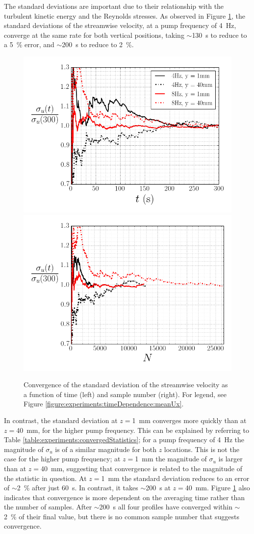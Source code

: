 \documentclass[12pt,oneside,a4paper]{article}
\begin{document}
The standard deviations are important due to their relationship with the turbulent kinetic energy and the Reynolds stresses. As observed in Figure \ref{figure:experiments:timeDependence:RMSux}, the standard deviations of the streamwise velocity, at a pump frequency of \SI{4}{Hz}, converge at the same rate for both vertical positions, taking $\sim$\SI{130}{s} to reduce to a \SI{5}{\%} error, and $\sim$\SI{200}{s} to reduce to \SI{2}{\%}. 
%
\begin{figure}[!h]
\centering
\includegraphics[width=0.5\linewidth]{images/LDA_timeDependenceImages/uxRMSTConvergence.png}\hfill
\includegraphics[width=0.5\linewidth]{images/LDA_timeDependenceImages/uxRMSNConvergence.png}\\
\caption{Convergence of the standard deviation of the streamwise velocity as a function of time (left) and sample number (right). For legend, see Figure \ref{figure:experiments:timeDependence:meanUx}.}
\label{figure:experiments:timeDependence:RMSux}
\end{figure}
%
In contrast, the standard deviation at $z=$\SI{1}{mm} converges more quickly than at $z=$\SI{40}{mm}, for the higher pump frequency. This can be explained by referring to Table \ref{table:experiments:convergedStatistics}; for a pump frequency of \SI{4}{Hz} the magnitude of $\sigma_u$ is of a similar magnitude for both $z$ locations. This is not the case for the higher pump frequency; at $z=$\SI{1}{mm} the magnitude of $\sigma_u$ is larger than at $z=$\SI{40}{mm}, suggesting that convergence is related to the magnitude of the statistic in question. At $z=$\SI{1}{mm} the standard deviation reduces to an error of $\sim$\SI{2}{\%} after just \SI{60}{s}. In contrast, it takes $\sim$\SI{200}{s} at $z=$\SI{40}{mm}. Figure \ref{figure:experiments:timeDependence:RMSux} also indicates that convergence is more dependent on the averaging time rather than the number of samples. After $\sim$\SI{200}{s} all four profiles have converged within $\sim$\SI{2}{\%} of their final value, but there is no common sample number that suggests convergence. 
\end{document}
